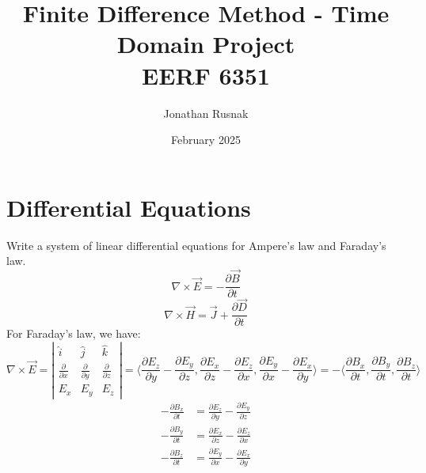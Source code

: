 \documentclass{article}
\title{Finite Difference Method - Time Domain Project\\EERF 6351}
\author{Jonathan Rusnak}
\date{February 2025}
\begin{document}
    
    \maketitle

    \tableofcontents

    \section{Differential Equations}
        Write a system of linear differential equations for Ampere's law and Faraday's law.
        \[
            \nabla\times\overrightarrow{E}
            =
            -
            \frac{\partial \overrightarrow{B}}{\partial t}
        \]
        \[  
            \nabla \times \overrightarrow{H}
            =
            \overrightarrow{J}
            +
            \frac{\partial\overrightarrow{D}}{\partial t}
        \]
        For Faraday's law, we have:
        \[
            \nabla\times\overrightarrow{E}
            =
            \left|
                \begin{matrix}
                    \hat{i} & \hat{j} & \hat{k}\\
                    \frac{\partial}{\partial x} &\frac{\partial}{\partial y} &\frac{\partial}{\partial z} \\
                    E_x &E_y & E_z
                \end{matrix}
            \right|
            =
            \langle
                \frac{\partial E_z}{\partial y}
                -
                \frac{\partial E_y}{\partial z}
                ,
                \frac{\partial E_x}{\partial z}
                -
                \frac{\partial E_z}{\partial x}
                ,
                \frac{\partial E_y}{\partial x}
                -
                \frac{\partial E_x}{\partial y}
            \rangle
            =
            -
            \langle
                \frac{\partial B_x}{\partial t},
                \frac{\partial B_y}{\partial t},
                \frac{\partial B_z}{\partial t}
            \rangle
        \]
        \begin{align}
            -\frac{\partial B_x}{\partial t}&=\frac{\partial E_z}{\partial y}-\frac{\partial E_y}{\partial z}\\
            -\frac{\partial B_y}{\partial t}&=\frac{\partial E_x}{\partial z}-\frac{\partial E_z}{\partial x}\\
            -\frac{\partial B_z}{\partial t}&=\frac{\partial E_y}{\partial x}-\frac{\partial E_x}{\partial y}
        \end{align}
\end{document}
